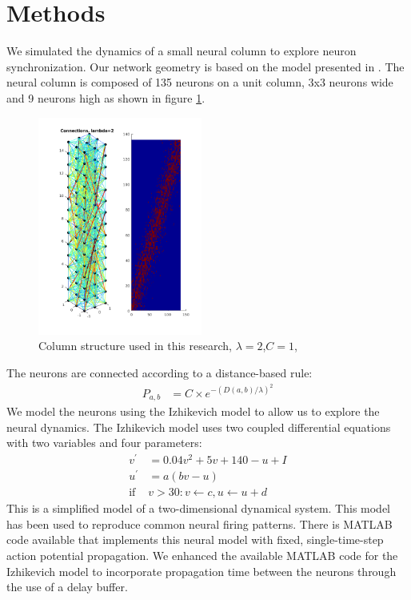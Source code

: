\documentclass[a4paper,11pt]{article}
\begin{document}
\section{Methods}
We simulated the dynamics of a small neural column to explore neuron synchronization.
Our network geometry is based on the model presented in \cite{markram1998}.
The neural column is composed of 135 neurons on a unit column, 3x3 neurons wide and 9 neurons high as shown in figure \ref{fig:column_structure}.
\begin{figure}[ht]
 \caption{Column structure used in this research, $\lambda=2$,$C=1$,}
 \label{fig:column_structure}
 \centering
   \includegraphics[width=0.48\textwidth]{fig/lambda2}
\end{figure}
The neurons are connected according to a distance-based rule:
\begin{align}\label{eq:connectivity}
 P_{a,b} &= C \times e^{-(D(a,b)/\lambda)^2}
\end{align}
We model the neurons using the Izhikevich model \cite{izhikevich2003} to allow us to explore the neural dynamics.
The Izhikevich model uses two coupled differential equations with two variables and four parameters:
\begin{align}
 v^\prime &= 0.04v^2+5v+140-u+I\\
 u^\prime &= a(bv-u)\\
 \text{if } &v>30: v\leftarrow c, u\leftarrow u+d
\end{align}
This is a simplified model of a two-dimensional dynamical system.
This model has been used to reproduce common neural firing patterns.
There is MATLAB code available that implements this neural model with fixed, single-time-step action potential propagation.
We enhanced the available MATLAB code for the Izhikevich model to incorporate propagation time between the neurons through the use of a delay buffer.
\end{document}
